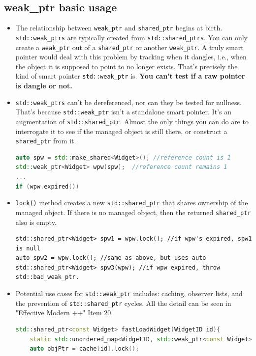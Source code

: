 \documentclass[a4paper,11pt,twoside]{book}
\begin{document}
\subsection{weak\_ptr basic usage}
\begin{itemize}

    \item The relationship between \texttt{weak\_ptr} and \texttt{shared\_ptr} begins at birth. \texttt{std::weak\_ptrs} are typically created from \texttt{std::shared\_ptrs}. You can only create a \texttt{weak\_ptr} out of a \texttt{shared\_ptr} or another \texttt{weak\_ptr}. A truly smart pointer would deal with this problem by tracking when it dangles, i.e., when the object it is supposed to point to no longer exists. That's precisely the kind of smart pointer \texttt{std::weak\_ptr} is. \textbf{You can't test if a raw pointer is dangle or not.}

    \item \texttt{std::weak\_ptrs} can't be dereferenced, nor can they be tested for nullness. That's because \texttt{std::weak\_ptr} isn't a standalone smart pointer. It's an augmentation of \texttt{std::shared\_ptr}. Almost the only things you can do are to interrogate it to see if the managed object is still there, or construct a \texttt{shared\_ptr} from it.

\begin{lstlisting}[frame=single, language=c++,mathescape=true]
auto spw = std::make_shared<Widget>(); //reference count is 1
std::weak_ptr<Widget> wpw(spw);  //reference count remains 1
...
if (wpw.expired())
\end{lstlisting}

    \item \texttt{lock()} method creates a new \texttt{std::shared\_ptr} that shares ownership of the managed object. If there is no managed object, then the returned \texttt{shared\_ptr} also is empty.

\begin{lstlisting}
std::shared_ptr<Widget> spw1 = wpw.lock(); //if wpw's expired, spw1 is null
auto spw2 = wpw.lock(); //same as above, but uses auto
std::shared_ptr<Widget> spw3(wpw); //if wpw expired, throw std::bad_weak_ptr.
\end{lstlisting}

    \item Potential use cases for \texttt{std::weak\_ptr} includes: caching, observer lists, and the prevention of \texttt{std::shared\_ptr} cycles.  All the detail can be seen in "Effective Modern ++" Item 20.
\begin{lstlisting}[frame=single, language=c++]
std::shared_ptr<const Widget> fastLoadWidget(WidgetID id){
	static std::unordered_map<WidgetID, std::weak_ptr<const Widget>> cache;
	auto objPtr = cache[id].lock();


\end{lstlisting}
\end{itemize}
\end{document}

